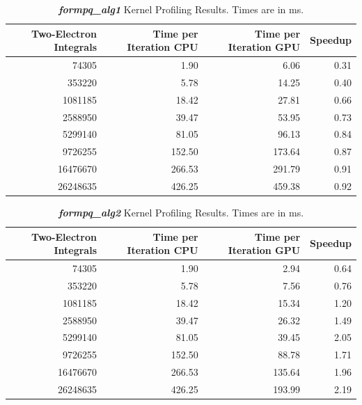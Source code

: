 \documentclass[12pt]{report}
\newcommand{\kernel}[1]{\textit{\textbf{#1}}}
\begin{document}
\begin{table}[h!]
\begin{center}
\caption[\kernel{formpq\_alg1} Kernel Profiling Results.]{\kernel{formpq\_alg1} Kernel Profiling Results. Times are in ms.}
\label{tab:PQprofalg1}
\begin{tabular}{rrrr}
\toprule
	Two-Electron Integrals	&	Time per Iteration CPU	&	Time per Iteration GPU	&	Speedup	\\
\midrule
	74305	&	1.90		&	6.06		&	0.31		\\
	353220	&	5.78		&	14.25	&	0.40		\\
	1081185	&	18.42	&	27.81	&	0.66		\\
	2588950	&	39.47	&	53.95	&	0.73		\\
	5299140	&	81.05	&	96.13	&	0.84		\\
	9726255	&	152.50	&	173.64	&	0.87		\\
	16476670	&	266.53	&	291.79	&	0.91		\\
	26248635	&	426.25	&	459.38	&	0.92		\\
\bottomrule
\end{tabular}
\end{center}
\end{table}

\begin{table}[h!]
\begin{center}
\caption[\kernel{formpq\_alg2} Kernel Profiling Results.]{\kernel{formpq\_alg2} Kernel Profiling Results. Times are in ms.}
\label{tab:PQprofalg2}
\begin{tabular}{rrrr}
\toprule
	Two-Electron Integrals	&	Time per Iteration CPU		&	Time per Iteration GPU	&	Speedup	\\
\midrule
	74305	&	1.90		&	2.94		&	0.64	\\
	353220	&	5.78		&	7.56		&	0.76	\\
	1081185	&	18.42	&	15.34	&	1.20	\\
	2588950	&	39.47	&	26.32	&	1.49	\\
	5299140	&	81.05	&	39.45	&	2.05	\\
	9726255	&	152.50	&	88.78	&	1.71	\\
	16476670	&	266.53	&	135.64	&	1.96	\\
	26248635	&	426.25	&	193.99	&	2.19	\\
\bottomrule
\end{tabular}
\end{center}
\end{table}
\end{document}
